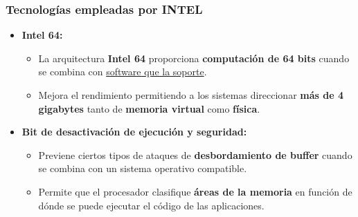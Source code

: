 \frame
{
\frametitle{Tecnologías empleadas por INTEL}
\begin{itemize}
 \item \textbf{Intel 64:}

	\begin{itemize}
		\item La arquitectura \textbf{Intel 64} proporciona \textbf{computación de 64 bits} cuando se combina con \underline{software que la soporte}. 
		\item Mejora el rendimiento permitiendo a los sistemas direccionar\textbf{ más de 4 gigabytes} tanto de \textbf{memoria virtual} como \textbf{física}.
 	\end{itemize}

 \item \textbf{Bit de desactivación de ejecución y seguridad:}

	\begin{itemize}
		\item Previene ciertos tipos de ataques de \textbf{desbordamiento de buffer} cuando se combina con un sistema operativo compatible.
		\item Permite que el procesador clasifique \textbf{áreas de la memoria} en función de dónde se puede ejecutar el código de las aplicaciones.\newline
	\end{itemize}

\begin{center}
\scriptsize {}
\end{center}
\end{itemize}
}

